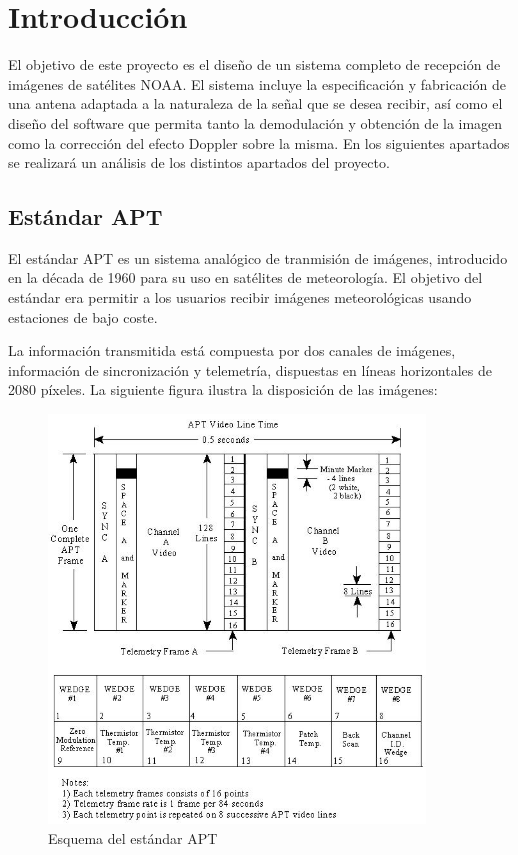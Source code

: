 \documentclass[a4paper,openright,12pt]{article}
\begin{document}


\tableofcontents
\newpage

\section{Introducción}

	El objetivo 	de este proyecto es el diseño de un sistema completo de recepción de imágenes de satélites NOAA. El sistema incluye la especificación y fabricación de una antena adaptada a la naturaleza de la señal que se desea recibir, así como el diseño del software que permita tanto la demodulación y obtención de la imagen como la corrección del efecto Doppler sobre la misma. En los siguientes apartados se realizará un análisis de los distintos apartados del proyecto.
	
	\subsection{Estándar APT}
	
	El estándar APT es un sistema analógico de tranmisión de imágenes, introducido en la década de 1960 para su uso en satélites de meteorología. El objetivo del estándar era permitir a los usuarios recibir imágenes meteorológicas usando estaciones de bajo coste. 
	
	La información transmitida está compuesta por dos canales de imágenes, información de sincronización y telemetría, dispuestas en líneas horizontales de 2080 píxeles. La siguiente figura ilustra la disposición de las imágenes:
	
	\begin{figure}[hbtp]
 \centering
 \includegraphics[width = 10cm]{imagenes/APT_frame.JPG}
 \caption{Esquema del estándar APT}
 \label{APT}
 \end{figure}
\end{document}
